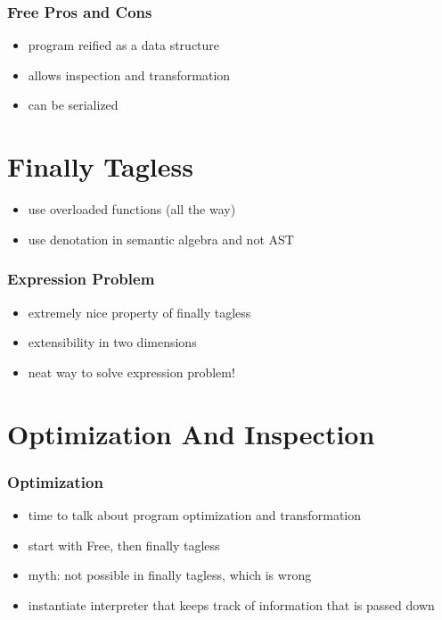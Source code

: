 \documentclass[aspectratio=169]{beamer}
\begin{document}
\begin{frame}
  \frametitle{Free \textemdash{} Pros and Cons}
  \begin{itemize}
  \item program reified as a data structure
  \item allows inspection and transformation
  \item can be serialized
  \end{itemize}
\end{frame}

\section{Finally Tagless}\label{sec:finally-tagless}

\begin{frame}
  \begin{itemize}
  \item use overloaded functions (all the way)
  \item use denotation in semantic algebra and not AST
  \end{itemize}
\end{frame}

\begin{frame}
  \frametitle{Expression Problem}
  \begin{itemize}
  \item extremely nice property of finally tagless
  \item extensibility in two dimensions
  \item neat way to solve expression problem!
  \end{itemize}
\end{frame}

\section{Optimization And Inspection}\label{sec:optimization-and-inspection}

\begin{frame}
  \frametitle{Optimization}
  \begin{itemize}
  \item time to talk about program optimization and transformation
  \item start with Free, then finally tagless
  \item myth: not possible in finally tagless, which is wrong
  \item instantiate interpreter that keeps track of information that is passed down
  \end{itemize}
\end{frame}
\end{document}
